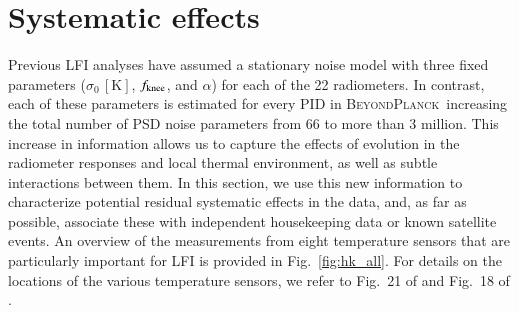 \documentclass{aa}
\newcommand{\BP}{\textsc{BeyondPlanck}}
\begin{document}
\section{Systematic effects}
\label{sec:systematics}
Previous LFI analyses have assumed a stationary noise model with three
fixed parameters ($\sigma_0 \,\mathrm{[K]}$, $f_{\rm knee}$, and
$\alpha$) for each of the 22 radiometers. In contrast, each of these
parameters is estimated for every PID in \BP\, increasing the total
number of PSD noise parameters from 66 to more than 3 million. This
increase in information allows us to capture the effects of evolution
in the radiometer responses and local thermal environment, as well as
subtle interactions between them. In this section, we use this
new information to characterize potential residual systematic effects
in the data, and, as far as possible, associate these with independent
housekeeping data or known satellite events. An overview of the
measurements from eight temperature sensors that are particularly
important for LFI is provided in Fig.~\ref{fig:hk_all}. For details on
the locations of the various temperature sensors, we refer to Fig.~21 of
\citet{bersanelli2010} and Fig.~18 of \citet{lamarre2010}. 
\end{document}
